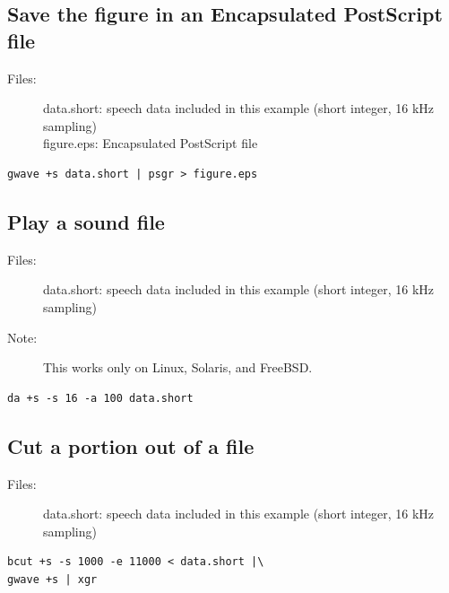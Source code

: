 \documentclass[a4paper,10pt]{article}
\begin{document}
\subsection{Save the figure in an Encapsulated PostScript file}

\begin{description}
\item[Files:]
  data.short: speech data included in this example (short integer, 16 kHz sampling)\\
  figure.eps: Encapsulated PostScript file
\end{description}

\begin{verbatim}
gwave +s data.short | psgr > figure.eps
\end{verbatim}

\subsection{Play a sound file}

\begin{description}
\item[Files:]
  data.short: speech data included in this example (short integer, 16 kHz sampling)
\item[Note:]
  This works only on Linux, Solaris, and FreeBSD.
\end{description}

\begin{verbatim}
da +s -s 16 -a 100 data.short
\end{verbatim}

\subsection{Cut a portion out of a file}

\begin{description}
\item[Files:]
  data.short: speech data included in this example (short integer, 16 kHz sampling)
\end{description}

\begin{verbatim}
bcut +s -s 1000 -e 11000 < data.short |\
gwave +s | xgr
\end{verbatim}
\end{document}
